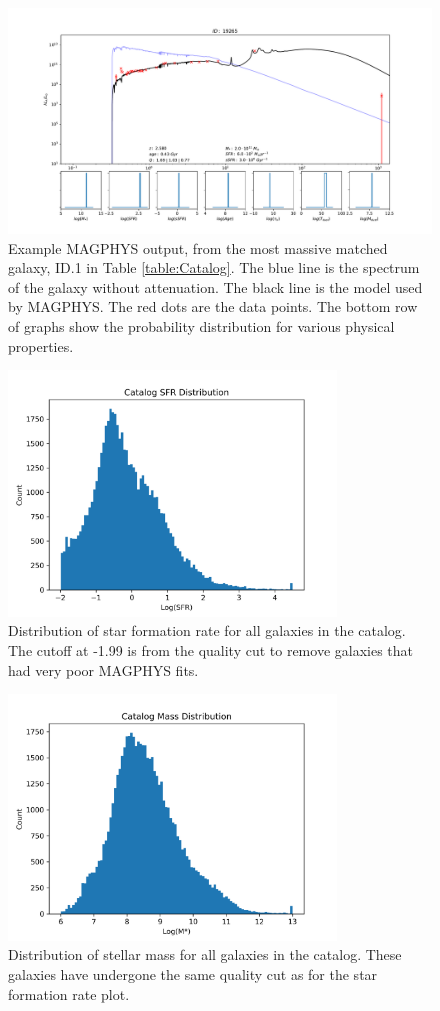 \begin{figure}[!hbp]
\centering \includegraphics[width=160mm]{19265.pdf}
\caption{Example MAGPHYS output, from the most massive matched galaxy, ID.1 in Table \ref{table:Catalog}. The blue line is the spectrum of the galaxy without attenuation. The black line is the model used by MAGPHYS. The red dots are the data points. The bottom row of graphs show the probability distribution for various physical properties.}
\label{fig:MAGPHYS_Example}
\end{figure}

\begin{figure}[!htbp]
\centering \includegraphics[width=87mm]{Survey/MAGPHYS_SFR.png}
\caption{Distribution of star formation rate for all galaxies in the catalog. The cutoff at -1.99 is from the quality cut to remove galaxies that had very poor MAGPHYS fits.}
\label{fig:MAGPHYS_SFR}
\end{figure}

\begin{figure}[!htbp]
\centering \includegraphics[width=87mm]{Survey/MAGPHYS_Mstar.png}
\caption{Distribution of stellar mass for all galaxies in the catalog. These galaxies have undergone the same quality cut as for the star formation rate plot.}
\label{fig:MAGPHYS_Mstar}
\end{figure}

